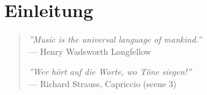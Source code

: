 \chapter{Einleitung}
\label{chap:Einleitung}


\begin{quote}
\textit{''Music is the universal language of mankind.''}
\\--- Henry Wadsworth Longfellow

\textit{''Wer hört auf die Worte, wo Töne siegen!''} 
\\--- Richard Strauss, Capriccio (scene 3)
\end{quote}


\vspace{1cm}


